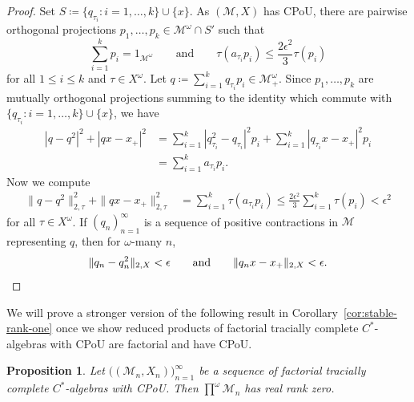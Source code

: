 \documentclass[a4paper,11pt]{amsart}
\newtheorem{proposition}[theorem]{Proposition}
\theoremstyle{definition}
\numberwithin{equation}{section}
\numberwithin{theorem}{section}
\newcommand{\M}{\mathcal{M}}
\begin{document}
\begin{proof}
	Set $S \coloneqq \{q_{\tau_i}: i=1,\ldots,k\} \cup \{x\}$.	As $(\M, X)$ has CPoU, there are pairwise orthogonal projections $p_1, \ldots, p_k \in \M^\omega \cap S'$ such that
	\begin{equation}
		\sum_{i=1}^k p_i = 1_{\M^\omega} \qquad \text{and} \qquad \tau(a_{\tau_i} p_i) \leq \frac{2\epsilon^2}{3}\tau(p_i)
	\end{equation}
	for all $1 \leq i \leq k$ and $\tau \in X^\omega$. Let $q \coloneqq \sum_{i=1}^k q_{\tau_i} p_i \in \M^\omega_+$. Since $p_1, \ldots, p_k$ are mutually orthogonal projections summing to the identity which commute with $\{q_{\tau_i}: i=1,\ldots,k\} \cup \{x\}$, we have
	\begin{equation}\begin{split}
		|q - q^2|^2 + |qx - x_+|^2 &= \sum_{i=1}^k |q_{\tau_i}^2 - q_{\tau_i}|^2p_i + \sum_{i=1}^k |q_{\tau_i}x - x_+|^2p_i \\
		&= \sum_{i=1}^k a_{\tau_i}p_i.
	\end{split}\end{equation}	
	Now we compute
	\begin{equation}\begin{split}
		\|q - q^2\|_{2, \tau}^2 + \|qx - x_+\|_{2, \tau}^2 &= \sum_{i=1}^k \tau(a_{\tau_i} p_i) \leq \frac{2\epsilon^2}{3} \sum_{i=1}^k \tau(p_i) < \epsilon^2
	\end{split}\end{equation} 
	for all $\tau \in X^\omega$.  If $(q_n)_{n=1}^\infty$ is a sequence of positive contractions in $\M$ representing $q$, then for $\omega$-many $n$,
	\begin{equation}
		\|q_n - q_n^2\|_{2, X} < \epsilon \qquad \text{and} \qquad \| q_nx - x_+\|_{2, X} < \epsilon. \qedhere
	\end{equation}
\end{proof}

We will prove a stronger version of the following result in Corollary~\ref{cor:stable-rank-one} once we show reduced products of factorial tracially complete $C^*$-algebras with CPoU are factorial and have CPoU.

\begin{proposition}\label{prop:real-rank-zero}
	Let $\big((\M_n, X_n)\big)_{n=1}^\infty$ be a sequence of factorial tracially complete $C^*$-algebras with CPoU. Then $\prod^\omega \M_n$ has real rank zero.
\end{proposition}
\end{document}
